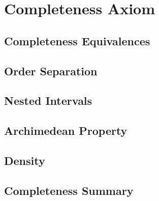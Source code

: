 \section{Completeness Axiom}


\subsection{Completeness Equivalences}


\subsection{Order Separation}


\subsection{Nested Intervals}


\subsection{Archimedean Property}


\subsection{Density}


\subsection{Completeness Summary}

